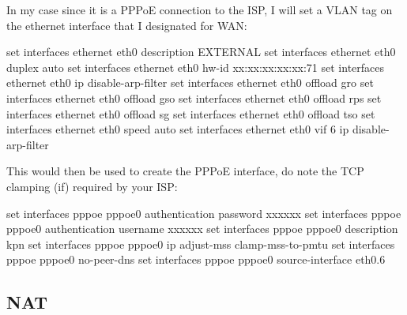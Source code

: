 \documentclass[
]{article}
\newenvironment{Shaded}{\begin{snugshade}}{\end{snugshade}}
\newcommand{\BuiltInTok}[1]{#1}
\newcommand{\NormalTok}[1]{#1}
\newcommand{\StringTok}[1]{\textcolor[rgb]{0.31,0.60,0.02}{#1}}
\begin{document}
In my case since it is a PPPoE connection to the ISP, I will set a VLAN
tag on the ethernet interface that I designated for WAN:

\begin{Shaded}
\begin{Highlighting}[numbers=left,,]
\BuiltInTok{set}\NormalTok{ interfaces ethernet eth0 description }\StringTok{\textquotesingle{}EXTERNAL\textquotesingle{}}
\BuiltInTok{set}\NormalTok{ interfaces ethernet eth0 duplex }\StringTok{\textquotesingle{}auto\textquotesingle{}}
\BuiltInTok{set}\NormalTok{ interfaces ethernet eth0 hw{-}id }\StringTok{\textquotesingle{}xx:xx:xx:xx:xx:71\textquotesingle{}}
\BuiltInTok{set}\NormalTok{ interfaces ethernet eth0 ip disable{-}arp{-}filter}
\BuiltInTok{set}\NormalTok{ interfaces ethernet eth0 offload gro}
\BuiltInTok{set}\NormalTok{ interfaces ethernet eth0 offload gso}
\BuiltInTok{set}\NormalTok{ interfaces ethernet eth0 offload rps}
\BuiltInTok{set}\NormalTok{ interfaces ethernet eth0 offload sg}
\BuiltInTok{set}\NormalTok{ interfaces ethernet eth0 offload tso}
\BuiltInTok{set}\NormalTok{ interfaces ethernet eth0 speed }\StringTok{\textquotesingle{}auto\textquotesingle{}}
\BuiltInTok{set}\NormalTok{ interfaces ethernet eth0 vif 6 ip disable{-}arp{-}filter}
\end{Highlighting}
\end{Shaded}

This would then be used to create the PPPoE interface, do note the TCP
clamping (if) required by your ISP:

\begin{Shaded}
\begin{Highlighting}[numbers=left,,]
\BuiltInTok{set}\NormalTok{ interfaces pppoe pppoe0 authentication password xxxxxx}
\BuiltInTok{set}\NormalTok{ interfaces pppoe pppoe0 authentication username xxxxxx}
\BuiltInTok{set}\NormalTok{ interfaces pppoe pppoe0 description }\StringTok{\textquotesingle{}kpn\textquotesingle{}}
\BuiltInTok{set}\NormalTok{ interfaces pppoe pppoe0 ip adjust{-}mss }\StringTok{\textquotesingle{}clamp{-}mss{-}to{-}pmtu\textquotesingle{}}
\BuiltInTok{set}\NormalTok{ interfaces pppoe pppoe0 no{-}peer{-}dns}
\BuiltInTok{set}\NormalTok{ interfaces pppoe pppoe0 source{-}interface }\StringTok{\textquotesingle{}eth0.6\textquotesingle{}}
\end{Highlighting}
\end{Shaded}

\newpage{}

\subsection{NAT}\label{nat}
\end{document}
